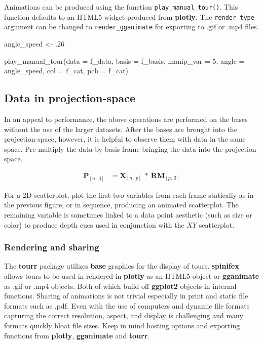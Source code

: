 Animations can be produced using the function
\texttt{play\_manual\_tour()}. This function defaults to an HTML5 widget
produced from \textbf{plotly}. The \texttt{render\_type} argument can be
changed to \texttt{render\_gganimate} for exporting to .gif or .mp4
files.

\begin{Schunk}
\begin{Sinput}
angle_speed <- .26

play_manual_tour(data = f_data,
                 basis = f_basis, 
                 manip_var = 5, 
                 angle = angle_speed,
                 col = f_cat,
                 pch = f_cat)
\end{Sinput}
\end{Schunk}

\hypertarget{sec:display}{%
\subsection{Data in projection-space}\label{sec:display}}

In an appeal to performance, the above operations are performed on the
bases without the use of the larger datasets. After the bases are
brought into the projection-space, however, it is helpful to observe
them with data in the same space. Pre-multiply the data by basis frame
bringing the data into the projection space.

\begin{align*}
  \textbf{P}_{[n,~3]} &= \textbf{X}_{[n,~p]} ~*~ \textbf{RM}_{[p,~3]}
\end{align*}

For a 2D scatterplot, plot the first two variables from each frame
statically as in the previous figure, or in sequence, producing an
animated scatterplot. The remaining variable is sometimes linked to a
data point aesthetic (such as size or color) to produce depth cues used
in conjunction with the \(XY\) scatterplot.

\hypertarget{rendering-and-sharing}{%
\subsubsection{Rendering and sharing}\label{rendering-and-sharing}}

The \textbf{tourr} package utilizes \textbf{base} graphics for the
display of tours. \textbf{spinifex} allows tours to be used in rendered
in \textbf{plotly} as an HTML5 object or \textbf{gganimate} as .gif or
.mp4 objects. Both of which build off \textbf{ggplot2} objects in
internal functions. Sharing of animations is not trivial especially in
print and static file formats such as .pdf. Even with the use of
computers and dynamic file formats capturing the correct resolution,
aspect, and display is challenging and many formats quickly bloat file
sizes. Keep in mind hosting options and exporting functions from
\textbf{plotly}, \textbf{gganimate} and \textbf{tourr}.

